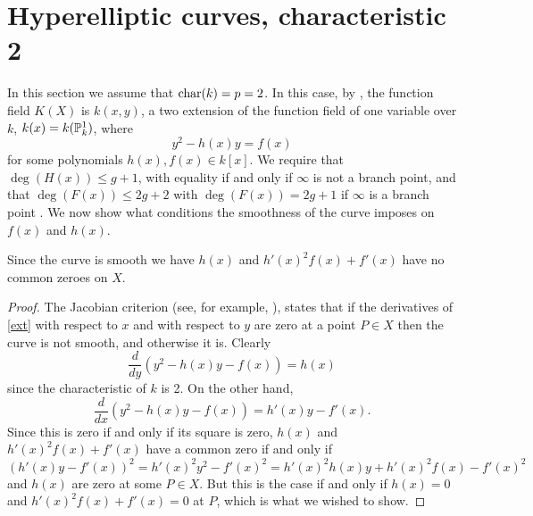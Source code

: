 \section{Hyperelliptic curves, characteristic 2}

In this section we assume that $\operatorname{char}(k) = p  =2$.   
In this case, by \cite[Prop. 7.4.24]{liu}, the function field $K(X)$ is $k(x,y)$, a two extension of the function field of one variable over $k$, $k(x) = k({\mathbb P}_k^1)$, where
    \begin{equation}\label{ext}
    y^2 - h(x)y = f(x)
    \end{equation}
for some polynomials $h(x), f(x)\in k[x]$.
We require that $\deg(H(x)) \leq g+1$, with equality if and only if $\infty$ is not a branch point, and that $\deg(F(x)) \leq 2g+2$ with $\deg(F(x)) = 2g+1$ if $\infty$ is a branch point  \cite[Prop.\ 7.4.24]{liu}.
We now show what conditions the smoothness of the curve imposes on $f(x)$ and $h(x)$.



    \begin{lem}\label{smoothness}
    Since the curve is smooth we have $h(x)$ and $h'(x)^2 f(x) + f'(x)$ have no common zeroes on $X$.
    \end{lem}
    \begin{proof}
    The Jacobian criterion (see, for example, \cite[Thm. 4.2.19]{liu}), states that if the derivatives of \eqref{ext} with respect to $x$ and with respect to $y$ are zero at a point $P\in X$ then the curve is not smooth, and otherwise it is.
    Clearly
        \[
        \frac{d}{dy} (y^2 -h(x)y -f(x)) = h(x)
        \]
    since the characteristic of $k$ is 2.
    On the other hand,
        \[
        \frac{d}{dx} (y^2 - h(x)y -f(x)) = h'(x)y - f'(x).
        \]
    Since this is zero if and only if its square is zero, $h(x)$ and $h'(x)^2 f(x) + f'(x)$ have a common zero if and only if
        \[
        (h'(x)y-f'(x))^2 = h'(x)^2y^2 -f'(x)^2 = h'(x)^2h(x)y + h'(x)^2f(x) - f'(x)^2
        \]
    and $h(x)$ are zero at some $P\in X$.
    But this is the case if and only if $h(x) = 0$ and $h'(x)^2f(x) + f'(x) = 0$ at $P$, which is what we wished to show.
    \end{proof}

